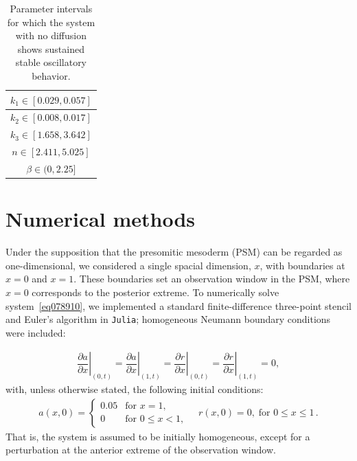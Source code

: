 \documentclass[11pt]{article}
\begin{document}
	\begin{table}[h] 
		\centering
		\begin{tabular}{|c|} \hline
			$k_1  \in [0.029, 0.057]$ \\ \hline
			$k_2  \in [0.008, 0.017]$ \\ \hline 
			$k_3  \in [1.658, 3.642]$ \\ \hline
			$n  \in  [2.411, 5.025]$ \\  \hline
			$\beta  \in  (0, 2.25]$ \\   \hline
		\end{tabular} 
		
		\caption{Parameter intervals for which the system with no diffusion shows
			sustained stable oscillatory behavior.}
		\label{Tab01}
	\end{table}
	
	\section{Numerical methods}
	\label{numer}
	
	Under the supposition that the presomitic mesoderm (PSM) can be regarded as
	one-dimensional, we considered a single spacial dimension, $x$, with boundaries
	at $x=0$ and $x=1$. These boundaries set an observation window in the PSM, where
	$x=0$ corresponds to the posterior extreme. To numerically solve
	system~\eqref{eq078910}, we implemented a standard finite-difference three-point
	stencil and Euler's algorithm in \texttt{Julia}; homogeneous Neumann boundary
	conditions were included:
	
	\begin{gather}\label{eqbn}
	\left. \dfrac{\partial a}{\partial x}\right|_{(0, t)} = 
	\left. \dfrac{\partial a}{\partial x}\right|_{(1, t)} = 
	\left. \dfrac{\partial r}{\partial x}\right|_{(0, t)} =
	\left. \dfrac{\partial r}{\partial x}\right|_{(1, t)} = 0 ,
	\end{gather}
	with, unless otherwise stated, the following initial conditions: 
	\begin{gather}
	a(x, 0) = \left\{\begin{array}{cl}
	0.05 & \text{for } x = 1, \\
	0 & \text{for } 0 \leq x < 1,
	\end{array} \right. 
	\quad
	r(x, 0) = 0, \; \text{for } 0 \leq x \leq 1\,.
	\end{gather}
	That is, the system is assumed to be initially homogeneous, except for a
	perturbation at the anterior extreme of the observation window.
	
\end{document}
